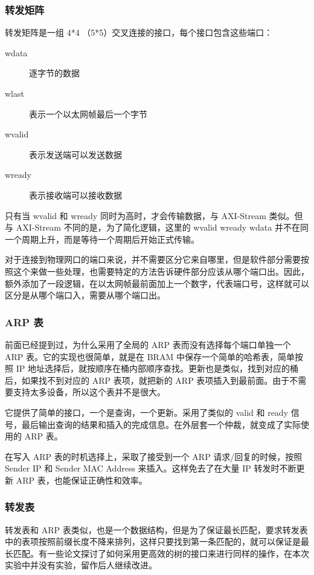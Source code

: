\documentclass{ctexart}
\begin{document}
\subsubsection{转发矩阵}
  转发矩阵是一组 4*4 （5*5）交叉连接的接口，每个接口包含这些端口：

  \begin{description}
    \item[wdata] 逐字节的数据
    \item[wlast] 表示一个以太网帧最后一个字节
    \item[wvalid] 表示发送端可以发送数据
    \item[wready] 表示接收端可以接收数据 
  \end{description}

  只有当 wvalid 和 wready 同时为高时，才会传输数据，与 AXI-Stream 类似。但与 AXI-Stream 不同的是，为了简化逻辑，这里的 wvalid wready wdata 并不在同一个周期上升，而是等待一个周期后开始正式传输。

  对于连接到物理网口的端口来说，并不需要区分它来自哪里，但是软件部分需要按照这个来做一些处理，也需要特定的方法告诉硬件部分应该从哪个端口出。因此，额外添加了一段逻辑，在以太网帧最前面加上一个数字，代表端口号，这样就可以区分是从哪个端口入，需要从哪个端口出。

\subsubsection{ARP 表}
  前面已经提到过，为什么采用了全局的 ARP 表而没有选择每个端口单独一个 ARP 表。它的实现也很简单，就是在 BRAM 中保存一个简单的哈希表，简单按照 IP 地址选择后，就按顺序在桶内部顺序查找。更新也是类似，找到对应的桶后，如果找不到对应的 ARP 表项，就把新的 ARP 表项插入到最前面。由于不需要支持太多设备，所以这个表并不是很大。

  它提供了简单的接口，一个是查询，一个更新。采用了类似的 valid 和 ready 信号，最后输出查询的结果和插入的完成信息。在外层套一个仲裁，就变成了实际使用的 ARP 表。

  在写入 ARP 表的时机选择上，采取了接受到一个 ARP 请求/回复的时候，按照 Sender IP 和 Sender MAC Address 来插入。这样免去了在大量 IP 转发时不断更新 ARP 表，也能保证正确性和效率。

\subsubsection{转发表}
  转发表和 ARP 表类似，也是一个数据结构，但是为了保证最长匹配，要求转发表中的表项按照前缀长度不降来排列，这样只要找到第一条匹配的，就可以保证是最长匹配。有一些论文探讨了如何采用更高效的树的接口来进行同样的操作，在本次实验中并没有实验，留作后人继续改进。
\end{document}
